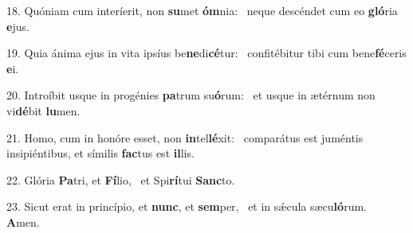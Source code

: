 18. Quóniam cum interíerit, non \textbf{su}met \textbf{óm}nia: \ast\  neque descéndet cum eo \textbf{gló}ria \textbf{e}jus.\

19. Quia ánima ejus in vita ipsíus be\textbf{ne}di\textbf{cé}tur: \ast\  confitébitur tibi cum bene\textbf{fé}ceris \textbf{e}i.\

20. Introíbit usque in progénies \textbf{pa}trum su\textbf{ó}rum: \ast\  et usque in ætérnum non vi\textbf{dé}bit \textbf{lu}men.\

21. Homo, cum in honóre esset, non \textbf{in}tel\textbf{lé}xit: \ast\  comparátus est juméntis insipiéntibus, et símilis \textbf{fac}tus est \textbf{il}lis.\

22. Glória \textbf{Pa}tri, et \textbf{Fí}lio, \ast\  et Spi\textbf{rí}tui \textbf{Sanc}to.\

23. Sicut erat in princípio, et \textbf{nunc}, et \textbf{sem}per, \ast\  et in sǽcula sæcu\textbf{ló}rum. \textbf{A}men.\

